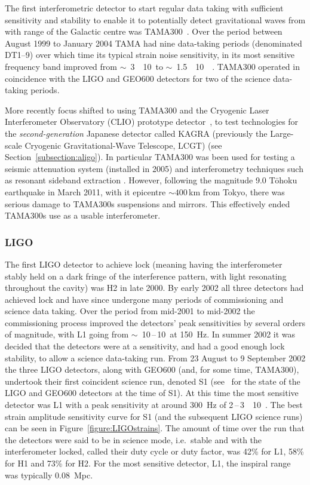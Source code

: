 The first interferometric detector to start regular data taking with sufficient sensitivity and stability to 
enable it to potentially detect gravitational waves from with range of the Galactic centre was 
TAMA300~\cite{Ando:2001}. Over the period between August 1999 to January 2004 TAMA had nine data-taking 
periods (denominated DT1--9) over which time its typical strain noise sensitivity, in its most sensitive 
frequency band improved from $\sim$~3~\texttimes~10~\Hz to
$\sim$~1.5~\texttimes~10~\Hz~\cite{Akutsu:2006}. TAMA300 operated in coincidence with the LIGO and 
GEO600 detectors for two of the science data-taking periods.

More recently focus shifted to using TAMA300 and the Cryogenic Laser Interferometer Observatory (CLIO) 
prototype detector~\cite{Yamamoto:2008, CLIOweb}, to test technologies for the \textit{second-generation} 
Japanese detector called KAGRA (previously  the Large-scale Cryogenic Gravitational-Wave Telescope, LCGT) (see 
Section~\ref{subsection:aligo}). In particular TAMA300 was been used for testing a seismic attenuation system 
(installed in 2005) and interferometry techniques such as resonant sideband extraction \cite{Arai:2009}. 
However, following the magnitude 9.0 T\={o}hoku earthquake in March 2011, with it epicentre $\sim 400$\,km 
from Tokyo, there was serious damage to TAMA300s suspensions and mirrors. This effectively ended TAMA300s use 
as a usable interferometer.

\subsubsection{LIGO}
\label{sec:ligoruns} 

The first LIGO detector to achieve lock (meaning having the interferometer stably held on a dark fringe of 
the interference pattern, with light resonating throughout the cavity) was H2 in late 2000. By early 2002 all 
three detectors had achieved lock and have since undergone many periods of commissioning and science data 
taking. Over the period from mid-2001 to mid-2002 the commissioning process improved the detectors' peak 
sensitivities by several orders of magnitude, with L1 going from
$\sim$~10\,--\,10~\Hz at 150~Hz. In summer 2002 it was decided that the detectors were 
at a sensitivity, and had a good enough lock stability, to allow a science data-taking run. From 23 August to 
9 September 2002 the three LIGO detectors, along with GEO600 (and, for some time, TAMA300), undertook their 
first coincident science run, denoted S1 (see~\cite{Abbott:2004a} for the state of the LIGO and GEO600 
detectors at the time of S1). At this time the most sensitive detector was L1 with a peak sensitivity at 
around 300~Hz of 2\,--\,3~\texttimes~10~\Hz. The best strain amplitude sensitivity curve for S1 
(and the subsequent LIGO science runs) can be seen in Figure~\ref{figure:LIGOstrains}. The amount of time over 
the run that the detectors were said to be in science mode, i.e.\ stable and with the interferometer locked, 
called their duty cycle or duty factor, was 42\% for L1, 58\% for H1 and 73\% for H2. For the most sensitive 
detector, L1, the inspiral range was typically 0.08~Mpc.

